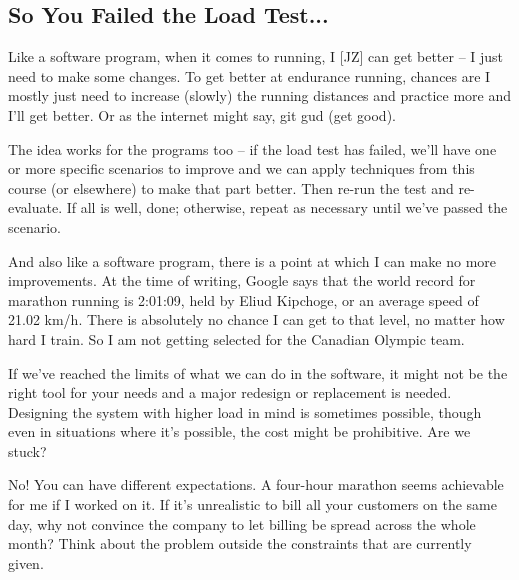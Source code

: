 \subsection*{So You Failed the Load Test...}
Like a software program, when it comes to running, I [JZ] can get better -- I just need to make some changes. To get better at endurance running, chances are I mostly just need to increase (slowly) the running distances and practice more and I'll get better. Or as the internet might say, git gud (get good).

The idea works for the programs too -- if the load test has failed, we'll have one or more specific scenarios to improve and we can apply techniques from this course (or elsewhere) to make that part better. Then re-run the test and re-evaluate. If all is well, done; otherwise, repeat as necessary until we've passed the scenario.

And also like a software program, there is a point at which I can make no more improvements. At the time of writing, Google says that the world record for marathon running is 2:01:09, held by Eliud Kipchoge, or an average speed of 21.02 km/h. There is absolutely no chance I can get to that level, no matter how hard I train. So I am not getting selected for the Canadian Olympic team.

If we've reached the limits of what we can do in the software, it might not be the right tool for your needs and a major redesign or replacement is needed. Designing the system with higher load in mind is sometimes possible, though even in situations where it's possible, the cost might be prohibitive. Are we stuck?

No! You can have different expectations. A four-hour marathon seems achievable for me if I worked on it. If it's unrealistic to bill all your customers on the same day, why not convince the company to let billing be spread across the whole month? Think about the problem outside the constraints that are currently given.

